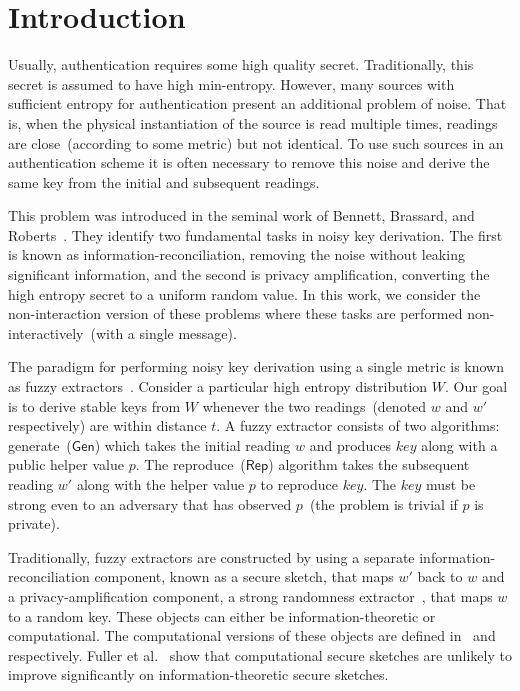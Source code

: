 \documentclass[11pt]{article}
\newcommand{\class}[1]{{\ensuremath{\mathsf{#1}}}}
\newcommand{\gen}{\ensuremath{\class{Gen}}\xspace}
\newcommand{\rep}{\ensuremath{\class{Rep}}\xspace}
\begin{document}
\section{Introduction}
Usually, authentication requires some high quality secret.  Traditionally, this secret is assumed to have high min-entropy.  However, many sources with sufficient entropy for authentication present an additional problem of noise.  That is, when the physical instantiation of the source is read multiple times, readings are close~(according to some metric) but not identical.  To use such sources in an authentication scheme it is often necessary to remove this noise and derive the same key from the initial and subsequent readings.

This problem was introduced in the seminal work of Bennett, Brassard, and Roberts~\cite{bennett1988privacy}.  They identify two fundamental tasks in noisy key derivation.  The first is known as information-reconciliation, removing the noise without leaking significant information, and the second is privacy amplification, converting the high entropy secret to a uniform random value.  In this work, we consider the non-interaction version of these problems where these tasks are performed non-interactively~(with a single message).

The paradigm for performing noisy key derivation using a single metric is known as fuzzy extractors~\cite{DBLP:journals/siamcomp/DodisORS08}.  Consider a particular high entropy distribution $W$.  Our goal is to derive stable keys from $W$ whenever the two readings~(denoted $w$ and $w'$ respectively) are within distance $t$.  A fuzzy extractor consists of two algorithms: generate~($\gen$) which takes the initial reading $w$ and produces $key$ along with a public helper value $p$.  The reproduce~($\rep$) algorithm takes the subsequent reading $w'$ along with the helper value $p$ to reproduce $key$.  The $key$ must be strong even to an adversary that has observed $p$~(the problem is trivial if $p$ is private).

Traditionally, fuzzy extractors are constructed by using a separate information-reconciliation component, known as a secure sketch, that maps $w'$ back to $w$ and a privacy-amplification component, a strong randomness extractor~\cite{nisan1993randomness}, that maps $w$ to a random key.  These objects can either be information-theoretic or computational.  The computational versions of these objects are defined in~\cite{krawczyk2010cryptographic} and~\cite{fuller2013computational} respectively.  Fuller et al.~\cite{fuller2013computational} show that computational secure sketches are unlikely to improve significantly on information-theoretic secure sketches.
\end{document}
